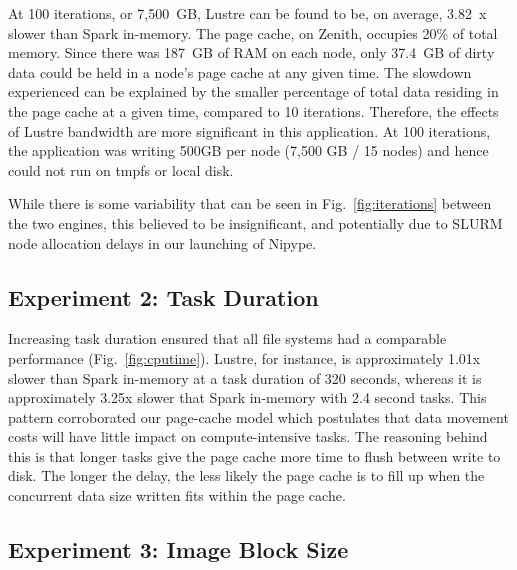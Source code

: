 \documentclass{IEEEtran}
\begin{document}


At 100 iterations, or 7,500~GB, Lustre can be found to be, on average, 3.82~x 
slower than Spark in-memory. The page cache, on Zenith, occupies 20\% of 
total memory. Since there was 187~GB of RAM on each node, only 37.4~GB of 
dirty data could be held in a node's page cache at any given time. The 
slowdown experienced can be explained by the smaller percentage of total data 
residing in the page cache at a given time, compared to 10 iterations. 
Therefore, the effects of Lustre bandwidth are more significant in 
this application. At 100 iterations, the application was writing 500GB 
per node (7,500 GB / 15 nodes) and hence could not run on tmpfs or local disk.

While there is some variability that can be seen in Fig.~\ref{fig:iterations} 
between the two engines, this believed to be insignificant, and potentially due 
to SLURM node allocation delays in our launching of Nipype.


\subsection{Experiment 2: Task Duration}
%


Increasing task duration ensured that all file systems had a comparable performance
(Fig.~\ref{fig:cputime}). Lustre, for instance, is approximately 1.01x slower
than Spark in-memory at a task duration of 320 seconds, whereas it is 
approximately 3.25x slower that Spark in-memory with 2.4 second tasks. This 
pattern corroborated our page-cache model which postulates that 
data movement costs will have little impact on compute-intensive tasks. The 
reasoning behind this is that longer tasks give the page cache more time to flush 
between write to disk. The longer the delay, the less likely the page cache is 
to fill up when the concurrent data size written fits within the page cache.

\subsection{Experiment 3: Image Block Size}
\end{document}

